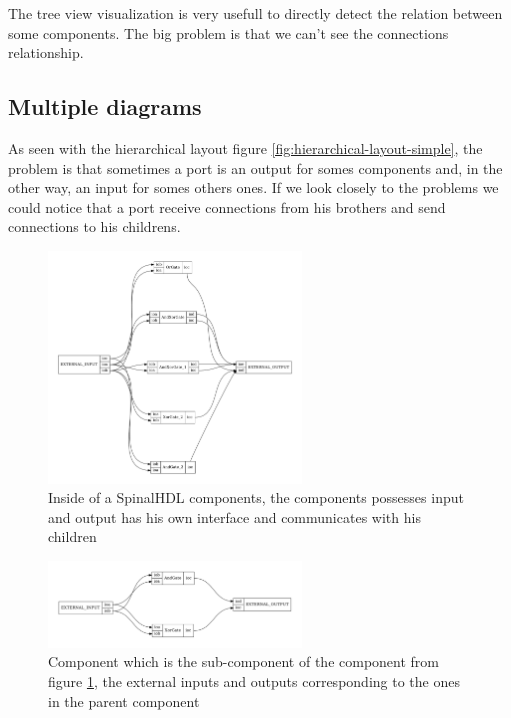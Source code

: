 The tree view visualization is very usefull to directly detect the relation
between some components. The big problem is that we can't see the connections
relationship.

\subsection{Multiple diagrams}

As seen with the hierarchical layout figure
\ref{fig:hierarchical-layout-simple}, the problem is that sometimes a port is an
output for somes components and, in the other way, an input for somes others
ones. If we look closely to the problems we could notice that a port receive
connections from his brothers and send connections to his childrens.

\begin{figure}[H]
  \centering
  \includegraphics[width=0.6\textwidth]{img/HierarchicComponent.pdf}
  \caption[SpinalHDL Component inside]{Inside of a SpinalHDL components, the
    components possesses input and output has his own interface and communicates
  with his children}
  \label{fig:hierarchic-component}
\end{figure}

\begin{figure}[H]
  \centering
  \includegraphics[width=0.6\textwidth]{img/AndXorGate.pdf}
  \caption[SpinalHDL Component inside an another]{Component which is the
    sub-component of the component from figure \ref{fig:hierarchic-component},
    the external inputs and outputs corresponding to the ones in the parent component}
  \label{fig:and-xor-gate}
\end{figure}

